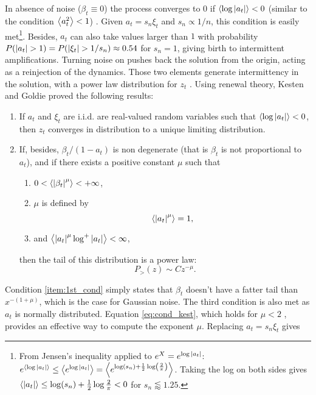 \documentclass[FinalReport.tex]{subfiles}
\begin{document}
In absence of noise ($\beta_t\equiv0$) the process converges to $0$ if $\expval{\log{\abs{a_t}}}<0$ (similar to the condition $\expval{a_t^2}<1$) \cite{constrained-convergent-processes}. Given $a_t=s_n\xi_t$ and $s_n\propto 1/n$, this condition is easily met\footnote{From Jensen's inequality applied to $e^X=e^{\log{\abs{a_t}}}$: $e^{\expval{\log{\abs{a_t}}}}\leq \expval{e^{\log{\abs{a_t}}}} = \expval{e^{\log(s_n) +\frac{1}{2}\log(\frac{2}{\pi})}}$. Taking the log on both sides gives $\expval{\abs{a_t}}\leq \log(s_n)+\frac{1}{2}\log{\frac{2}{\pi} }<0 $ for $s_n\lessapprox1.25$.}. Besides, $a_t$ can also take values larger than $1$ with probability $P(\abs{a_t}>1)=P(\abs{\xi_t}>1/s_n)\approx0.54$ for $s_n=1$, giving birth to intermittent amplifications. Turning noise on pushes back the solution from the origin, acting as a reinjection of the dynamics. Those two elements generate intermittency in the solution, with a power law distribution for $z_t$ \cite{lin-stochastic-eq-nonlinear-properties}. 
Using renewal theory, Kesten and Goldie proved \cite{kesten,goldie} the following results:
\begin{enumerate}
	\item If $a_t$ and $\xi_t$ are i.i.d. are real-valued random variables such that $\expval{\log{\abs{a_t}}}<0$, then $z_t$ converges in distribution to a unique limiting distribution.
	\item If, besides, $\beta_t/(1-a_t)$ is non degenerate (that is $\beta_t$ is not proportional to $a_t$), and if there exists a positive constant $\mu$ such that
	\begin{enumerate}
		\item $0<\expval{\abs{\beta_t}^\mu}<+\infty$,\label{item:1st_cond} 
		\item $\mu$ is defined by 
			\begin{equation}\label{eq:cond_kest}
			\expval{\abs{a_t}^\mu}=1,
			\end{equation}
		\item and $\expval{\abs{a_t}^\mu\log^+{\abs{a_t}}}<\infty$,
	\end{enumerate}
 then the tail of this distribution is a power law:
 \begin{equation}
 	P_>(z)\sim Cz^{-\mu}.	
 \end{equation}
\end{enumerate}
Condition \ref{item:1st_cond} simply states that $\beta_t$ doesn't have a fatter tail than $x^{-(1+\mu)}$, which is the case for Gaussian noise. The third condition is also met as $a_t$ is normally distributed. Equation \eqref{eq:cond_kest}, which holds for $\mu<2$ \cite{TST}, provides an effective way to compute the exponent $\mu$. Replacing $a_t=s_n\xi_t$ gives
\end{document}
